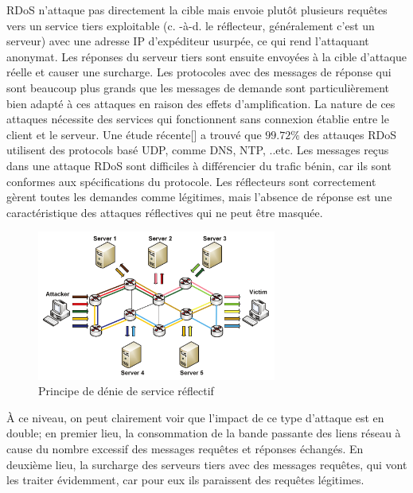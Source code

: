 RDoS n’attaque pas directement la cible mais envoie plutôt plusieurs requêtes vers un service tiers exploitable (c. -à-d. le réflecteur, généralement c'est un serveur) avec une adresse IP d’expéditeur usurpée, ce qui rend l'attaquant anonymat. Les réponses du serveur tiers sont ensuite envoyées à la cible d’attaque réelle et causer une surcharge. Les protocoles avec des messages de réponse qui sont beaucoup plus grands que les messages de demande sont particulièrement bien adapté à ces attaques en raison des effets d’amplification. La nature de ces attaques nécessite des services qui fonctionnent sans connexion établie entre le client et le serveur. Une étude récente[\cite{20}] a trouvé que $ 99.72\% $ des attauqes RDoS utilisent des protocols basé UDP, comme DNS, NTP, ..etc. Les messages reçus dans une attaque RDoS sont difficiles à différencier du trafic bénin, car ils sont conformes aux spécifications du protocole. Les réflecteurs sont correctement gèrent toutes les demandes comme légitimes, mais l’absence de réponse est une caractéristique des attaques réflectives qui ne peut être masquée.

\begin{figure}[h]
\centering
\includegraphics[width=0.7\textwidth]{Figures/rDoS}
\decoRule
\caption{Principe de dénie de service réflectif}
\label{fig:rDoS}
\end{figure} 

À ce niveau, on peut clairement voir que l'impact de ce type d'attaque est en double; en premier lieu, la consommation de la bande passante des liens réseau à cause du nombre excessif des messages requêtes et réponses échangés. En deuxième lieu, la surcharge des serveurs tiers avec des messages requêtes, qui vont les traiter évidemment, car pour eux ils paraissent des requêtes légitimes.\\ 

